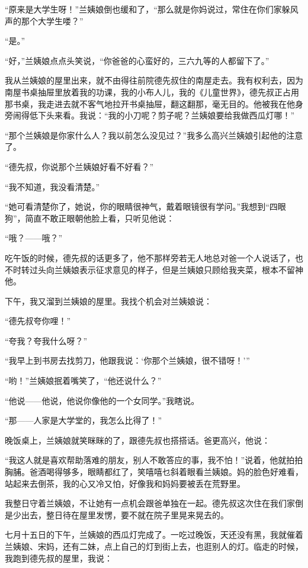 \par “原来是大学生呀！”兰姨娘倒也缓和了，“那么就是你妈说过，常住在你们家躲风声的那个大学生喽？”
\par “是。”
\par “好，”兰姨娘点点头笑说，“你爸爸的心蛮好的，三六九等的人都留下了。”
\par 我从兰姨娘的屋里出来，就不由得往前院德先叔住的南屋走去。我有权利去，因为南屋书桌抽屉里放着我的功课，我的小布人儿，我的《儿童世界》，德先叔正占用那书桌，我走进去就不客气地拉开书桌抽屉，翻这翻那，毫无目的。他被我在他身旁闹得低下头来看。我说：“我的小刀呢？剪子呢？兰姨娘要给我做西瓜灯哪！”
\par “那个兰姨娘是你家什么人？我以前怎么没见过？”我多么高兴兰姨娘引起他的注意了。
\par “德先叔，你说那个兰姨娘好看不好看？”
\par “我不知道，我没看清楚。”
\par “她可看清楚你了，她说，你的眼睛很神气，戴着眼镜很有学问。”我想到“四眼狗”，简直不敢正眼朝他脸上看，只听见他说：
\par “哦？——哦？”
\par 吃午饭的时候，德先叔的话更多了，他不那样旁若无人地总对爸一个人说话了，也不时转过头向兰姨娘表示征求意见的样子，但是兰姨娘只顾给我夹菜，根本不留神他。
\par 下午，我又溜到兰姨娘的屋里。我找个机会对兰姨娘说：
\par “德先叔夸你哩！”
\par “夸我？夸我什么呀？”
\par “我早上到书房去找剪刀，他跟我说：‘你那个兰姨娘，很不错呀！'”
\par “哟！”兰姨娘抿着嘴笑了，“他还说什么？”
\par “他说——他说，他说你像他的一个女同学。”我瞎说。
\par “那——人家是大学堂的，我怎么比得了！”
\par 晚饭桌上，兰姨娘就笑眯眯的了，跟德先叔也搭搭话。爸更高兴，他说：
\par “我这人就是喜欢帮助落难的朋友，别人不敢答应的事，我不怕！”说着，他就拍拍胸脯。爸酒喝得够多，眼睛都红了，笑嘻嘻乜斜着眼看兰姨娘。妈的脸色好难看，站起来去倒茶，我的心又冷又怕，好像我和妈妈要被丢在荒野里。
\par 我整日守着兰姨娘，不让她有一点机会跟爸单独在一起。德先叔这次住在我们家倒是少出去，整日待在屋里发愣，要不就在院子里晃来晃去的。
\par 七月十五日的下午，兰姨娘的西瓜灯完成了。一吃过晚饭，天还没有黑，我就催着兰姨娘、宋妈，还有二妹，点上自己的灯到街上去，也逛别人的灯。临走的时候，我跑到德先叔的屋里，我说：
